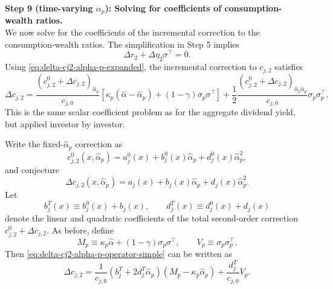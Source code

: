 \noindent\textbf{Step 9 (time-varying $\alpha_p$): Solving for coefficients of consumption-wealth ratios.}\\
We now solve for the coefficients of the incremental correction to the consumption-wealth ratios.
The simplification in Step 5 implies
\begin{equation}
    \Delta r_2+\Delta\eta_2\sigma^\top=0.
\end{equation}
Using \eqref{eq:delta-cj2-alpha-p-expanded}, the incremental correction to $c_{j,2}$ satisfies
\begin{equation}\label{eq:delta-cj2-alpha-p-operator-simple}
    \Delta c_{j,2}
    =\frac{(c_{j,2}^{0}+\Delta c_{j,2})_{\hat{\alpha}_p}}{c_{j,0}}
    \left[\kappa_p(\hat{\alpha}-\hat{\alpha}_p)+(1-\gamma)\sigma_p\sigma^\top\right]
    +\frac{1}{2}\frac{(c_{j,2}^{0}+\Delta c_{j,2})_{\hat{\alpha}_p\hat{\alpha}_p}}{c_{j,0}}\sigma_p\sigma_p^\top.
\end{equation}
This is the same scalar coefficient problem as for the aggregate dividend yield, but applied investor by investor.

Write the fixed-$\hat{\alpha}_p$ correction as
\begin{equation}
    c_{j,2}^{0}(x,\hat{\alpha}_p)
    =a_j^{0}(x)+b_j^{0}(x)\hat{\alpha}_p+d_j^{0}(x)\hat{\alpha}_p^2,
\end{equation}
and conjecture
\begin{equation}
    \Delta c_{j,2}(x,\hat{\alpha}_p)
    =a_j(x)+b_j(x)\hat{\alpha}_p+d_j(x)\hat{\alpha}_p^2.
\end{equation}
Let
\begin{equation}
    b_j^T(x)\equiv b_j^{0}(x)+b_j(x),
    \qquad
    d_j^T(x)\equiv d_j^{0}(x)+d_j(x)
\end{equation}
denote the linear and quadratic coefficients of the total second-order correction $c_{j,2}^{0}+\Delta c_{j,2}$.
As before, define
\begin{equation}
    M_p\equiv\kappa_p\hat{\alpha}+(1-\gamma)\sigma_p\sigma^\top,
    \qquad
    V_p\equiv\sigma_p\sigma_p^\top.
\end{equation}
Then \eqref{eq:delta-cj2-alpha-p-operator-simple} can be written as
\begin{equation}\label{eq:delta-cj2-alpha-p-coeff-operator}
    \Delta c_{j,2}
    =\frac{1}{c_{j,0}}(b_j^T+2d_j^T\hat{\alpha}_p)
    (M_p-\kappa_p\hat{\alpha}_p)
    +\frac{d_j^T}{c_{j,0}}V_p.
\end{equation}

